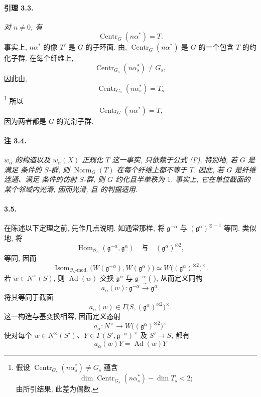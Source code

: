 \paragraph{\textbf{引理 3.3.}}
\emph{对 \(n\ne0\), 有}
\[
  \operatorname{Centr}_G(n\alpha^\ast)=T.
\]
事实上, \(n\alpha^\ast\) 的像 \(T'\) 是 \(G\) 的子环面. 由, \(\operatorname{Centr}_G(n\alpha^\ast)\) 是 \(G\) 的一个包含 \(T\) 的约化子群. 在每个纤维上,
\[
  \operatorname{Centr}_{G_s}(n\alpha^\ast_s)\ne G_s,
\]
因此由,
\[
  \operatorname{Centr}_{G_s}(n\alpha^\ast_s)=T_s
\]
\footnote{假设 \(\operatorname{Centr}_{G_s}(n\alpha^\ast_s)\ne G_s\) 蕴含
\[
  \dim\operatorname{Centr}_{G_s}(n\alpha^\ast_s)-\dim T_s<2;
\]
由所引结果, 此差为偶数.}
所以
\[
  \operatorname{Centr}_G(n\alpha^\ast)=T,
\]
因为两者都是 \(G\) 的光滑子群.

\paragraph{\textbf{注 3.4.}}
\emph{\(w_\alpha\) 的构造以及 \(w_\alpha(X)\) 正规化 \(T\) 这一事实, 只依赖于公式 \textup{(F)}. 特别地, 若 \(G\) 是满足  条件的 \(S\)-群, 则 \(\operatorname{Norm}_G(T)\) 在每个纤维上都不等于 \(T\). 因此, 若 \(G\) 是纤维连通、满足  条件的仿射 \(S\)-群, 则 \(G\) 约化且半单秩为 \(1\). 事实上, 它在单位截面的某个邻域内光滑, 因而光滑, 且 的判据适用.}

\paragraph{\textbf{3.5.}}
在陈述以下定理之前, 先作几点说明. 如通常那样, 将 \(\mathfrak g^{-\alpha}\) 与 \((\mathfrak g^\alpha)^{\otimes-1}\) 等同. 类似地, 将
\[
  \operatorname{Hom}_{\mathscr O_S}
    (\mathfrak g^{-\alpha},\mathfrak g^\alpha)
  \quad\text{与}\quad
  (\mathfrak g^\alpha)^{\otimes2},
\]
等同, 因而
\[
  \operatorname{Isom}_{\mathscr O_S\text{-mod.}}
    \bigl(W(\mathfrak g^{-\alpha}),W(\mathfrak g^\alpha)\bigr)
  \simeq
  W\bigl((\mathfrak g^\alpha)^{\otimes2}\bigr)^\times.
\]
若 \(w\in N^\times(S)\), 则 \(\operatorname{Ad}(w)\) 交换 \(\mathfrak g^\alpha\) 与 \(\mathfrak g^{-\alpha}\) \textup{( \textup{})}, 从而定义同构
\[
  a_\alpha(w)\colon
  \mathfrak g^{-\alpha}\xrightarrow{\ \sim\ }\mathfrak g^\alpha.
\]
将其等同于截面
\[
  a_\alpha(w)\in
  \Gamma\bigl(S,(\mathfrak g^\alpha)^{\otimes2}\bigr)^\times.
\]
这一构造与基变换相容, 因而定义态射
\[
  a_\alpha\colon
  N^\times\longrightarrow
  W\bigl((\mathfrak g^\alpha)^{\otimes2}\bigr)^\times
\]
使对每个 \(w\in N^\times(S')\)、\(Y\in\Gamma(S',\mathfrak g^{-\alpha})^\times\) 及 \(S'\to S\), 都有
\[
  a_\alpha(w)Y=\operatorname{Ad}(w)Y
\]

